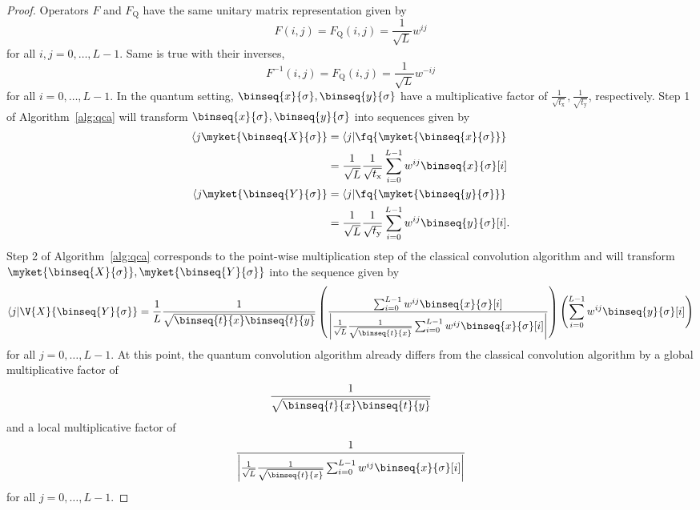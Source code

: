\begin{proof}
Operators $F$ and $F_{\mathrm{Q}}$ have the same unitary matrix representation given by
	\[
		F(i,j) = F_{\mathrm{Q}}(i,j) = \frac{1}{\sqrt{L}} w^{ij}
	\]
	for all $i,j=0,\ldots,L-1$. Same is true with their inverses,
	\[
		F^{-1}(i,j) = F_{\mathrm{Q}}(i,j) = \frac{1}{\sqrt{L}} w^{-ij}
	\]
for all $i=0,\ldots,L-1$. In the quantum setting, $\binseq{x}{\sigma}, \binseq{y}{\sigma}$ have a multiplicative factor of $\frac{1}{\sqrt{t_{\mathrm{x}}}}, \frac{1}{\sqrt{t_{\mathrm{y}}}}$, respectively. Step 1 of Algorithm~\ref{alg:qca} will transform $\binseq{x}{\sigma},\binseq{y}{\sigma}$ into sequences given by
\begin{align*}
	\langle j \myket{\binseq{X}{\sigma}} &= \langle j \vert \fq{\myket{\binseq{x}{\sigma}}}\\
	                                                        &= \frac{1}{\sqrt{L}} \frac{1}{\sqrt{t_{\mathrm{x}}}} \sum_{i=0}^{L-1} w^{ij} \binseq{x}{\sigma}[i]\\
	\langle j \myket{\binseq{Y}{\sigma}} &= \langle j \vert \fq{\myket{\binseq{y}{\sigma}}}\\
	                                                        &= \frac{1}{\sqrt{L}} \frac{1}{\sqrt{t_{\mathrm{y}}}} \sum_{i=0}^{L-1} w^{ij} \binseq{y}{\sigma}[i].
\end{align*}
Step 2 of Algorithm~\ref{alg:qca} corresponds to the point-wise multiplication step of the classical convolution algorithm and will transform $\myket{\binseq{X}{\sigma}}, \myket{\binseq{Y}{\sigma}}$ into the sequence given by
\begin{align*}
	\langle j \vert \V{X}{\binseq{Y}{\sigma}} = \frac{1}{L} \frac{1}{\sqrt{\binseq{t}{x}\binseq{t}{y}}} \left(\frac{\sum_{i=0}^{L-1} w^{ij} \binseq{x}{\sigma}[i]}{\left\vert \frac{1}{\sqrt{L}}\frac{1}{\sqrt{\binseq{t}{x}}} \sum_{i=0}^{L-1} w^{ij} \binseq{x}{\sigma}[i] \right\vert}\right)\left( \sum_{i=0}^{L-1} w^{ij} \binseq{y}{\sigma}[i] \right)
\end{align*}
for all $j=0,\ldots,L-1$. At this point, the quantum convolution algorithm already differs from the classical convolution algorithm by a global multiplicative factor of 
\[
	\frac{1}{\sqrt{\binseq{t}{x}\binseq{t}{y}}}
\] 
and a local multiplicative factor of
\[
	\frac{1}{\left\vert \frac{1}{\sqrt{L}} \frac{1}{\sqrt{\binseq{t}{x}}} \sum_{i=0}^{L-1} w^{ij} \binseq{x}{\sigma}[i] \right\vert}
\]
for all $j=0,\ldots,L-1$.
\end{proof}
